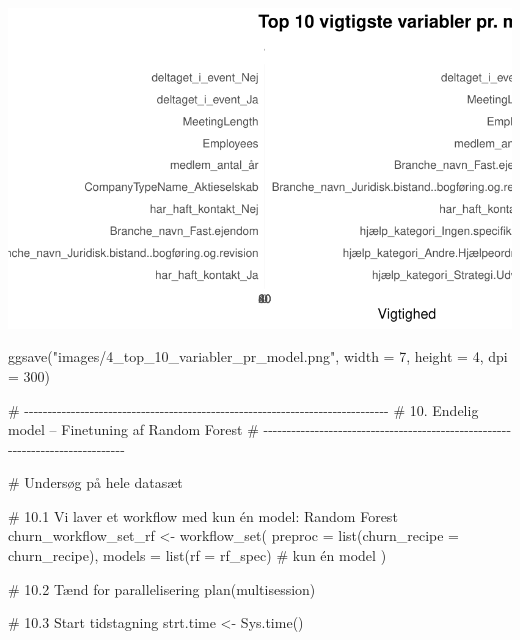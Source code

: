 \documentclass[
  11pt,
  letterpaper,
  DIV=11,
  numbers=noendperiod]{scrartcl}
\newenvironment{Shaded}{\begin{snugshade}}{\end{snugshade}}
\newcommand{\AttributeTok}[1]{\textcolor[rgb]{0.40,0.45,0.13}{#1}}
\newcommand{\CommentTok}[1]{\textcolor[rgb]{0.37,0.37,0.37}{#1}}
\newcommand{\DecValTok}[1]{\textcolor[rgb]{0.68,0.00,0.00}{#1}}
\newcommand{\FunctionTok}[1]{\textcolor[rgb]{0.28,0.35,0.67}{#1}}
\newcommand{\NormalTok}[1]{\textcolor[rgb]{0.00,0.23,0.31}{#1}}
\newcommand{\OtherTok}[1]{\textcolor[rgb]{0.00,0.23,0.31}{#1}}
\newcommand{\StringTok}[1]{\textcolor[rgb]{0.13,0.47,0.30}{#1}}
\begin{document}
\includegraphics{Quarto_files/figure-pdf/unnamed-chunk-12-4.pdf}

\begin{Shaded}
\begin{Highlighting}[]
\FunctionTok{ggsave}\NormalTok{(}\StringTok{"images/4\_top\_10\_variabler\_pr\_model.png"}\NormalTok{, }\AttributeTok{width =} \DecValTok{7}\NormalTok{, }\AttributeTok{height =} \DecValTok{4}\NormalTok{, }\AttributeTok{dpi =} \DecValTok{300}\NormalTok{)}
\end{Highlighting}
\end{Shaded}

\begin{Shaded}
\begin{Highlighting}[]
\CommentTok{\# {-}{-}{-}{-}{-}{-}{-}{-}{-}{-}{-}{-}{-}{-}{-}{-}{-}{-}{-}{-}{-}{-}{-}{-}{-}{-}{-}{-}{-}{-}{-}{-}{-}{-}{-}{-}{-}{-}{-}{-}{-}{-}{-}{-}{-}{-}{-}{-}{-}{-}{-}{-}{-}{-}{-}{-}{-}{-}{-}{-}{-}{-}{-}{-}{-}{-}{-}{-}{-}{-}{-}{-}{-}{-}{-}{-}{-}{-}}
\CommentTok{\# 10. Endelig model – Finetuning af Random Forest}
\CommentTok{\# {-}{-}{-}{-}{-}{-}{-}{-}{-}{-}{-}{-}{-}{-}{-}{-}{-}{-}{-}{-}{-}{-}{-}{-}{-}{-}{-}{-}{-}{-}{-}{-}{-}{-}{-}{-}{-}{-}{-}{-}{-}{-}{-}{-}{-}{-}{-}{-}{-}{-}{-}{-}{-}{-}{-}{-}{-}{-}{-}{-}{-}{-}{-}{-}{-}{-}{-}{-}{-}{-}{-}{-}{-}{-}{-}{-}{-}{-}}

\CommentTok{\# Undersøg på hele datasæt}

\CommentTok{\# 10.1 Vi laver et workflow med kun én model: Random Forest}
\NormalTok{churn\_workflow\_set\_rf }\OtherTok{\textless{}{-}} \FunctionTok{workflow\_set}\NormalTok{(}
  \AttributeTok{preproc =} \FunctionTok{list}\NormalTok{(}\AttributeTok{churn\_recipe =}\NormalTok{ churn\_recipe),}
  \AttributeTok{models  =} \FunctionTok{list}\NormalTok{(}\AttributeTok{rf =}\NormalTok{ rf\_spec)  }\CommentTok{\# kun én model}
\NormalTok{)}

\CommentTok{\# 10.2 Tænd for parallelisering}
\FunctionTok{plan}\NormalTok{(multisession)}

\CommentTok{\# 10.3 Start tidstagning}
\NormalTok{strt.time }\OtherTok{\textless{}{-}} \FunctionTok{Sys.time}\NormalTok{()}
\end{Highlighting}
\end{Shaded}
\end{document}
